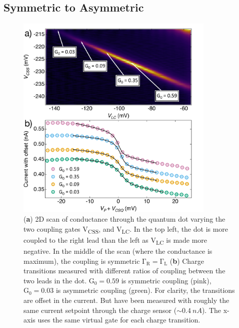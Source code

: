 \subsection{Symmetric to Asymmetric}


\begin{figure}[!hbt]
 \begin{center}
 \includegraphics[width=0.85\textwidth]{figures/ch3/figure18.pdf}
 \caption[Symmetric to Asymmetric Coupling]{\label{fig:ch3/symmetry_picking} 
 (\textbf{a}) 2D scan of conductance through the quantum dot varying the two coupling gates V\textsubscript{CSS}, and V\textsubscript{LC}. In the top left, the dot is more coupled to the right lead than the left as V\textsubscript{LC} is made more negative. In the middle of the scan (where the conductance is maximum), the coupling is symmetric $\mathrm{\Gamma_R} = \mathrm{\Gamma_L}$ (\textbf{b}) Charge transitions measured with different ratios of coupling between the two leads in the dot. $\mathrm{G_0} = 0.59$ is symmetric coupling (pink), $\mathrm{G_0} = 0.03$ is asymmetric coupling (green). For clarity, the transitions are offset in the current. But have been measured with roughly the same current setpoint through the charge sensor ($\sim\qty{0.4}{nA}$). The x-axis uses the same virtual gate for each charge transition. 
 }
 \end{center}
\end{figure}


